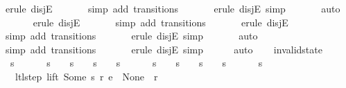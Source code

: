 \begin{isabellebody}
\ {\isacharparenleft}erule\ disjE{\isacharparenright}\isanewline
\ \ \ \ \ \isamarkupfalse%
\ {\isacharparenleft}simp\ add{\isacharcolon}\ transitions{\isacharparenright}\isanewline
\ \ \ \ \ \isamarkupfalse%
\ {\isacharparenleft}erule\ disjE{\isacharcomma}\ simp{\isacharparenright}\isanewline
\ \ \ \ \ \isamarkupfalse%
\ auto{\isacharbrackleft}{}{\isacharbrackright}\isanewline
\ \ \ \ \ \isamarkupfalse%
\ {\isacharparenleft}erule\ disjE{\isacharparenright}\isanewline
\ \ \ \ \ \isamarkupfalse%
\ {\isacharparenleft}simp\ add{\isacharcolon}\ transitions{\isacharparenright}\isanewline
\ \ \ \ \ \isamarkupfalse%
\ {\isacharparenleft}erule\ disjE{\isacharparenright}\isanewline
\ \ \ \ \ \isamarkupfalse%
\ {\isacharparenleft}simp\ add{\isacharcolon}\ transitions{\isacharparenright}\isanewline
\ \ \ \ \ \isamarkupfalse%
\ {\isacharparenleft}erule\ disjE{\isacharcomma}\ simp{\isacharparenright}\isanewline
\ \ \ \ \ \isamarkupfalse%
\ auto{\isacharbrackleft}{}{\isacharbrackright}\isanewline
\ \ \ \ \ \isamarkupfalse%
\ {\isacharparenleft}simp\ add{\isacharcolon}\ transitions{\isacharparenright}\isanewline
\ \ \ \ \ \isamarkupfalse%
\ {\isacharparenleft}erule\ disjE{\isacharcomma}\ simp{\isacharparenright}\isanewline
\ \ \ \ \isamarkupfalse%
\ auto\isanewline
\ \ \isamarkupfalse%
%
\endisatagproof
{\isafoldproof}%
%
\isadelimproof
\isanewline
%
\endisadelimproof
\isanewline
{}\isamarkupfalse%
\ invalid{\isacharunderscore}state{\isacharcolon}\isanewline
\ \ {\isachardoublequoteopen}s\ {\isasymnoteq}\ {}\ {\isasymLongrightarrow}\isanewline
\ \ \ s\ {\isasymnoteq}\ {}\ {\isasymand}\ s\ {\isasymnoteq}\ {}\ {\isasymand}\ s\ {\isasymnoteq}\ {}\ {\isasymand}\ s\ {\isasymnoteq}\ {}\ {\isasymLongrightarrow}\isanewline
\ \ \ s\ {\isasymnoteq}\ {}\ {\isasymand}\ s\ {\isasymnoteq}\ {}\ {\isasymand}\ s\ {\isasymnoteq}\ {}\ {\isasymand}\ s\ {\isasymnoteq}\ {}\ {\isasymLongrightarrow}\isanewline
\ \ \ s\ {\isasymnoteq}\ {}\ {\isasymLongrightarrow}\isanewline
\ \ \ ltl{\isacharunderscore}step\ lift\ {\isacharparenleft}Some\ s{\isacharparenright}\ r\ e\ {\isacharequal}\ {\isacharparenleft}None{\isacharcomma}\ {\isacharbrackleft}{\isacharbrackright}{\isacharcomma}\ r{\isacharparenright}{\isachardoublequoteclose}\isanewline

\end{isabellebody}
